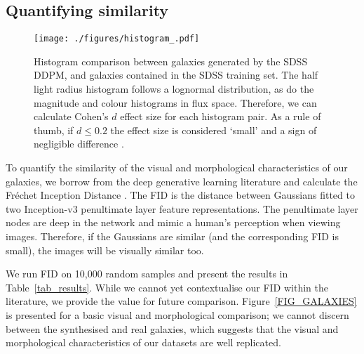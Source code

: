 \documentclass[fleqn,usenatbib]{mnras}
\begin{document}
\subsection{Quantifying similarity} \label{sec_sgd}

\begin{figure}
    \centering
    \texttt{[image: ./figures/histogram\_.pdf]}
    \caption{Histogram comparison between galaxies generated by the SDSS DDPM,
    and galaxies contained in the SDSS training set. The half
    light radius histogram follows a lognormal distribution, as do the
    magnitude and colour histograms in flux space. Therefore, we can calculate
    Cohen's $d$ effect size for each histogram pair. As a rule of thumb, if $d
    \le 0.2$ the effect size is considered `small' and a sign of negligible
    difference \citep{cite_cohen1988}.}
    \label{fig_hists_qqs}
\end{figure}

To quantify the similarity of the visual and morphological characteristics of
our galaxies, we borrow from the deep generative learning literature and
calculate the Fr\'echet Inception Distance
\citep[FID;][]{cite_heusel2017,cite_seitzer2020}. The FID is the distance
\citep{cite_dowson1982} between Gaussians fitted to two Inception-v3
\citep{cite_szegedy2016} penultimate layer feature representations. The
penultimate layer nodes are deep in the network and mimic a human's perception
when viewing images. Therefore, if the Gaussians are similar (and the
corresponding FID is small), the images will be visually similar too.

We run FID on 10,000 random samples and present the results in
Table~\ref{tab_results}.  While we cannot yet contextualise our
FID within the literature, we provide the value for future comparison.  
Figure~\ref{FIG_GALAXIES} is presented for a basic visual and morphological
comparison; we cannot discern between the synthesised and real galaxies, which
suggests that the visual and morphological characteristics of our datasets are
well replicated.
\end{document}
